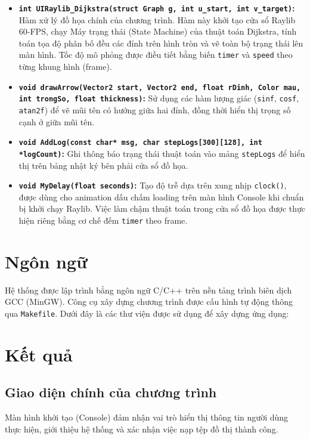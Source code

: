 \documentclass[12pt,a4paper,oneside]{report}
\begin{document}
\begin{itemize}
    \item \textbf{\texttt{int UIRaylib\_Dijkstra(struct Graph g, int u\_start, int v\_target)}:} Hàm xử lý đồ họa chính của chương trình. Hàm này khởi tạo cửa sổ Raylib 60-FPS, chạy Máy trạng thái (State Machine) của thuật toán Dijkstra, tính toán tọa độ phân bố đều các đỉnh trên hình tròn và vẽ toàn bộ trạng thái lên màn hình. Tốc độ mô phỏng được điều tiết bằng biến \texttt{timer} và \texttt{speed} theo từng khung hình (frame).
    
    \item \textbf{\texttt{void drawArrow(Vector2 start, Vector2 end, float rDinh, Color mau, int trongSo, float thickness)}:} Sử dụng các hàm lượng giác (\texttt{sinf}, \texttt{cosf}, \texttt{atan2f}) để vẽ mũi tên có hướng giữa hai đỉnh, đồng thời hiển thị trọng số cạnh ở giữa mũi tên.
    
    \item \textbf{\texttt{void AddLog(const char* msg, char stepLogs[300][128], int *logCount)}:} Ghi thông báo trạng thái thuật toán vào mảng \texttt{stepLogs} để hiển thị trên bảng nhật ký bên phải cửa sổ đồ họa.
    
    \item \textbf{\texttt{void MyDelay(float seconds)}:} Tạo độ trễ dựa trên xung nhịp \texttt{clock()}, được dùng cho animation dấu chấm loading trên màn hình Console khi chuẩn bị khởi chạy Raylib. Việc làm chậm thuật toán trong cửa sổ đồ họa được thực hiện riêng bằng cơ chế đếm \texttt{timer} theo frame.
\end{itemize}

\section{Ngôn ngữ}
Hệ thống được lập trình bằng ngôn ngữ C/C++ trên nền tảng trình biên dịch GCC (MinGW). Công cụ xây dựng chương trình được cấu hình tự động thông qua \texttt{Makefile}. Dưới đây là các thư viện được sử dụng để xây dựng ứng dụng:


\section{Kết quả}

\subsection{Giao diện chính của chương trình}
Màn hình khởi tạo (Console) đảm nhận vai trò hiển thị thông tin người dùng thực hiện, giới thiệu hệ thống và xác nhận việc nạp tệp đồ thị thành công. 
\end{document}
